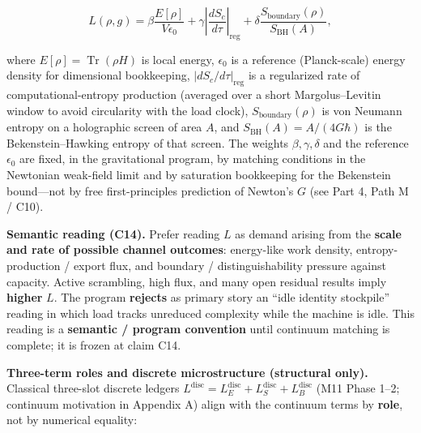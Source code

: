 \documentclass[
  11pt,
]{article}
\begin{document}
\[
L(\rho,g)
=
\beta \frac{E[\rho]}{V \epsilon_0}
+
\gamma \left| \frac{d S_c}{d\tau} \right|_{\mathrm{reg}}
+
\delta \frac{S_{\mathrm{boundary}}(\rho)}{S_{\mathrm{BH}}(A)},
\]

where \(E[\rho]=\operatorname{Tr}(\rho H)\) is local energy,
\(\epsilon_0\) is a reference (Planck-scale) energy density for
dimensional bookkeeping, \(\lvert dS_c/d\tau\rvert_{\mathrm{reg}}\) is a
regularized rate of computational-entropy production (averaged over a
short Margolus--Levitin window to avoid circularity with the load
clock), \(S_{\mathrm{boundary}}(\rho)\) is von Neumann entropy on a
holographic screen of area \(A\), and \(S_{\mathrm{BH}}(A)=A/(4G\hbar)\)
is the Bekenstein--Hawking entropy of that screen. The weights
\(\beta,\gamma,\delta\) and the reference \(\epsilon_0\) are fixed, in
the gravitational program, by matching conditions in the Newtonian
weak-field limit and by saturation bookkeeping for the Bekenstein
bound---not by free first-principles prediction of Newton's \(G\) (see
Part 4, Path M / C10).

\textbf{Semantic reading (C14).} Prefer reading \(L\) as demand arising
from the \textbf{scale and rate of possible channel outcomes}:
energy-like work density, entropy-production / export flux, and boundary
/ distinguishability pressure against capacity. Active scrambling, high
flux, and many open residual results imply \textbf{higher} \(L\). The
program \textbf{rejects} as primary story an ``idle identity stockpile''
reading in which load tracks unreduced complexity while the machine is
idle. This reading is a \textbf{semantic / program convention} until
continuum matching is complete; it is frozen at claim C14.

\textbf{Three-term roles and discrete microstructure (structural only).}
Classical three-slot discrete ledgers
\(L^{\mathrm{disc}}=L_E^{\mathrm{disc}}+L_S^{\mathrm{disc}}+L_B^{\mathrm{disc}}\)
(M11 Phase 1--2; continuum motivation in Appendix A) align with the
continuum terms by \textbf{role}, not by numerical equality:
\end{document}
